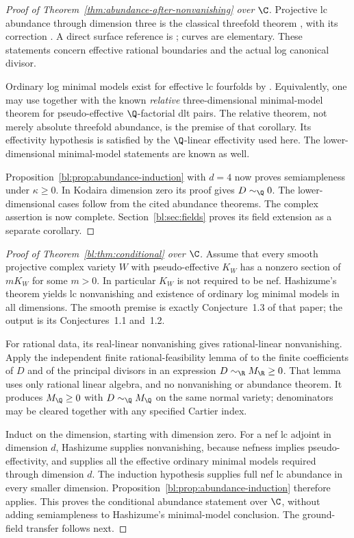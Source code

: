 \begin{proof}[Proof of Theorem~\ref{thm:abundance-after-nonvanishing} over $\C$]
Projective lc abundance through dimension three is the classical
threefold theorem \cite[Theorem~1.1]{KMM1994}, with its correction
\cite{KMM2004}.  A direct surface reference is
\cite[Theorem~7.2]{Fujino2012}; curves are elementary.  These
statements concern effective rational boundaries and the actual
log canonical divisor.

Ordinary log minimal models exist for effective lc fourfolds by
\cite[Corollary~1.6]{Birkar2010}.  Equivalently, one may use
\cite[Corollary~1.7]{Birkar2011} together with the known
\emph{relative} three-dimensional minimal-model theorem for
pseudo-effective $\Q$-factorial dlt pairs.  The relative theorem,
not merely absolute threefold abundance, is the premise of that
corollary.  Its effectivity hypothesis is satisfied by the
$\Q$-linear effectivity used here.  The lower-dimensional
minimal-model statements are known as well.

Proposition~\ref{bl:prop:abundance-induction} with $d=4$ now proves
semiampleness under $\kappa\geq0$.  In Kodaira dimension zero
its proof gives $D\sim_{\Q}0$.  The lower-dimensional cases
follow from the cited abundance theorems.  The complex assertion is now complete. Section~\ref{bl:sec:fields}
proves its field extension as a separate corollary.
\end{proof}

\begin{proof}[Proof of Theorem~\ref{bl:thm:conditional} over $\C$]
Assume that every smooth projective complex variety $W$ with
pseudo-effective $K_W$ has a nonzero section of $mK_W$ for some
$m>0$.  In particular $K_W$ is not required to be nef.
Hashizume's theorem \cite[Theorem~1.4]{Hashizume2018} yields
lc nonvanishing and existence of ordinary log minimal models
in all dimensions.  The smooth premise is exactly Conjecture~1.3
of that paper; the output is its Conjectures~1.1 and~1.2.

For rational data, its real-linear nonvanishing gives rational-linear
nonvanishing. Apply the independent finite rational-feasibility lemma
of \cite[Lemma~8.1]{OpenAINonvanishing2026}
to the finite coefficients of $D$ and of the principal divisors in an
expression $D\sim_{\R}M_{\R}\geq0$. That lemma uses only rational
linear algebra, and no nonvanishing or abundance theorem. It produces
$M_{\Q}\geq0$ with $D\sim_{\Q}M_{\Q}$ on the same normal variety;
denominators may be cleared together with any specified Cartier index.

Induct on the dimension, starting with dimension zero.  For a
nef lc adjoint in dimension $d$, Hashizume supplies nonvanishing,
because nefness implies pseudo-effectivity, and supplies all
the effective ordinary minimal models required through dimension
$d$.  The induction hypothesis supplies full nef lc abundance
in every smaller dimension.  Proposition~\ref{bl:prop:abundance-induction}
therefore applies.  This proves the conditional abundance
statement over $\C$, without adding semiampleness to Hashizume's
minimal-model conclusion.  The ground-field transfer follows next.
\end{proof}
